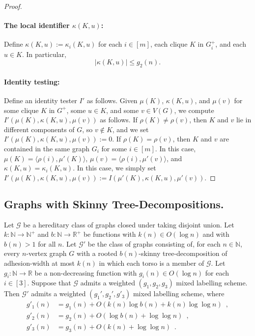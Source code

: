 \documentclass[twoside,leqno]{article}
\newcommand{\R}{\mathbb{R}}
\newcommand{\N}{\mathbb{N}}
\renewcommand{\leq}{\leqslant}
\newcommand{\david}[1]{\noindent{\color{orange} DW: #1}}
\newcommand{\vida}[1]{\noindent{\color{pink} VD: #1}}
\newcommand{\Oh}{O}
\begin{document}
\begin{proof}
  \paragraph{The local identifier $\kappa(K,u)$:}
  Define $\kappa(K,u) := \kappa_i(K,u)$ for each $i\in[m]$, each clique $K$ in $G^+_i$, and each $u\in K$. In particular,
  \[
    |\kappa(K,u)| \leq g_2(n).
  \]

  \paragraph{Identity testing:}
  Define an identity tester $I'$ as follows.
  Given $\mu(K)$, $\kappa(K,u)$, and $\mu(v)$ for some clique $K$ in $G^+$, some $u\in K$, and some $v\in V(G)$, we compute $I'(\mu(K),\kappa(K,u),\mu(v))$ as follows.
  If $\rho(K)\neq\rho(v)$, then $K$ and $v$ lie in different components of $G$, so $v\not\in K$, and we set $I'(\mu(K),\kappa(K,u),\mu(v)):=0$.  If $\rho(K)=\rho(v)$, then $K$ and $v$ are contained in the same graph $G_i$ for some $i\in[m]$. In this case, 
  $\mu(K)=\langle\rho(i),\mu'(K)\rangle$,
  $\mu(v)=\langle\rho(i),\mu'(v)\rangle$, and
  $\kappa(K,u)=\kappa_i(K,u)$.
  In this case, we simply set $I'(\mu(K),\kappa(K,u),\mu(v)) := I(\mu'(K),\kappa(K,u),\mu'(v))$.
\end{proof}

\subsection{Graphs with Skinny Tree-Decompositions.}
\label{sec:skinny}

\begin{lem}\label{skinny_labelling}
  Let $\mathcal{G}$ be a hereditary class of graphs closed under taking disjoint union.
  Let $k:\N\to\N^+$ and $b:\N\to\R^+$ be functions with $k(n)\in\Oh(\log n)$ and with $b(n)>1$ for all $n$.
  Let $\mathcal{G}'$ be the class of graphs consisting of, for each $n\in\N$, every $n$-vertex graph $G$ with a rooted $b(n)$-skinny tree-decomposition of adhesion-width at most $k(n)$ in which each torso is a member of $\mathcal{G}$.
  Let $g_i:\N\to\R$ be a non-decreasing function with $g_i(n)\in \Oh(\log n)$ for each $i\in[3]$.
  Suppose that $\mathcal{G}$ admits a weighted $(g_1,g_2,g_3)$ mixed labelling scheme.
  Then $\mathcal{G}'$ admits a weighted $(g_1',g_2',g'_3)$ mixed labelling scheme, where
  \begin{align*}
    g'_1(n)
     & = g_1(n) + \Oh(k(n)\log b(n) + k(n) \log\log n)\enspace, \\
    g'_2(n)
     & = g_2(n)+\Oh(\log b(n)+\log\log n)\enspace,              \\
    g'_3(n)
     & = g_3(n) + \Oh(k(n) + \log\log n)\enspace.
  \end{align*}
\end{lem}
\end{document}
